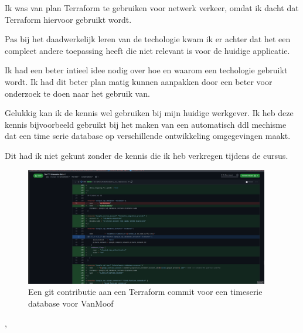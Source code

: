 {{{			Ik was van plan Terraform te gebruiken voor netwerk verkeer, omdat ik dacht dat Terraform hiervoor gebruikt wordt.

			Pas bij het daadwerkelijk leren van de techologie kwam ik er achter dat het een compleet andere toepassing heeft die niet relevant is voor de huidige applicatie.
		}
		{%

			Ik had een beter intieel idee nodig over hoe en waarom een techologie gebruikt wordt.
			Ik had dit beter plan matig kunnen aanpakken door een beter voor onderzoek te doen naar het gebruik van.

			Gelukkig kan ik de kennis wel gebruiken bij mijn huidige werkgever.
			Ik heb deze kennis bijvoorbeeld gebruikt bij het maken van een automatisch ddl mechisme dat een time serie database op verschillende ontwikkeling omgegevingen maakt.

			Dit had ik niet gekunt zonder de kennis die ik heb verkregen tijdens de cursus.
		}
		{
		}
	}
	{%

		\begin{figure}[H]
			\begin{center}
				\includegraphics[width=0.95\textwidth]{images/timeseries.png}
			\end{center}
			\caption{Een git contributie aan een Terraform commit voor een timeserie database voor VanMoof}
			\label{fig:terraformcommit}
		\end{figure}

	},
}

